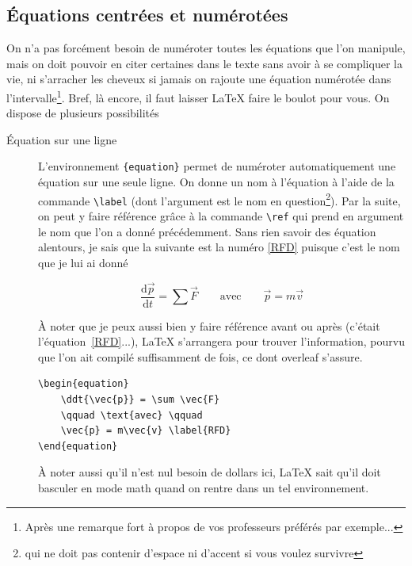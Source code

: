 \documentclass[12pt,a4paper]{article}
\newenvironment{code}{%
\begin{mdframed}[linecolor=Green,innerrightmargin=30pt,innerleftmargin=30pt,
backgroundcolor=Black!5,
skipabove=10pt,skipbelow=10pt,roundcorner=5pt,
splitbottomskip=6pt,splittopskip=12pt]
}{%
\end{mdframed}
}
\newcommand{\dd}{\text{d}}
\newcommand{\ddt}[1]{\frac{\dd #1}{\dd t}}
\newcommand{\env}[1]{\texttt{\{#1\}}}
\newcommand{\cmd}[1]{\texttt{\textbackslash#1}}
\begin{document}
\subsection{Équations centrées et numérotées}

On n'a pas forcément besoin de numéroter toutes les équations que l'on manipule, mais on doit pouvoir en citer certaines dans le texte sans avoir à se compliquer la vie, ni s'arracher les cheveux si jamais on rajoute une équation numérotée dans l'intervalle\footnote{Après une remarque fort à propos de vos professeurs préférés par exemple...}. Bref, là encore, il faut laisser \LaTeX{} faire le boulot pour vous. On dispose de plusieurs possibilités
	\begin{description}
    	\item[Équation sur une ligne] L'environnement \env{equation} permet de numéroter automatiquement une équation sur une seule ligne. On donne un nom à l'équation à l'aide de la commande \cmd{label} (dont l'argument est le nom en question\footnote{qui ne doit pas contenir d'espace ni d'accent si vous voulez survivre}). Par la suite, on peut y faire référence grâce à la commande \cmd{ref} qui prend en argument le nom que l'on a donné précédemment. Sans rien savoir des équation alentours, je sais que la suivante est la numéro \ref{RFD} puisque c'est le nom que je lui ai donné
        
\begin{equation}
    \ddt{\vec{p}} = \sum \vec{F} 
    \qquad \text{avec} \qquad 
    \vec{p} = m\vec{v} \label{RFD}
\end{equation}

À noter que je peux aussi bien y faire référence avant ou après (c'était l'équation~\ref{RFD}...), \LaTeX{} s'arrangera pour trouver l'information, pourvu que l'on ait compilé suffisamment de fois, ce dont overleaf s'assure. 

\begin{code}
\begin{verbatim}
\begin{equation}
    \ddt{\vec{p}} = \sum \vec{F} 
    \qquad \text{avec} \qquad 
    \vec{p} = m\vec{v} \label{RFD}
\end{equation}
\end{verbatim}
\end{code}

À noter aussi qu'il n'est nul besoin de dollars ici, \LaTeX{} sait qu'il doit basculer en mode math quand on rentre dans un tel environnement.


\end{description}
\end{document}
